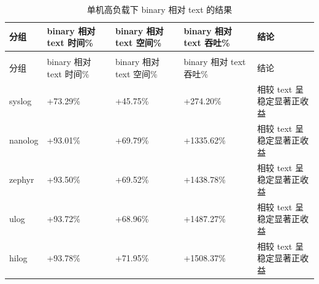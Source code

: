 \begin{longtable}[]{@{}
  >{\centering\arraybackslash}p{}
  >{\centering\arraybackslash}p{}
  >{\centering\arraybackslash}p{}
  >{\centering\arraybackslash}p{}
  >{\raggedright\arraybackslash}p{}@{}}
\caption{单机高负载下 binary 相对 text 的结果}\label{tbl:single-vs-text}\tabularnewline
\toprule\noalign{}
\begin{minipage}[t]{\hsize}\centering
分组
\end{minipage} & \begin{minipage}[t]{\hsize}\centering
binary 相对 text 时间\%
\end{minipage} & \begin{minipage}[t]{\hsize}\centering
binary 相对 text 空间\%
\end{minipage} & \begin{minipage}[t]{\hsize}\centering
binary 相对 text 吞吐\%
\end{minipage} & \begin{minipage}[t]{\hsize}\centering
结论
\end{minipage} \\
\midrule\noalign{}
\endfirsthead
\multicolumn{5}{r}{（续表\thetable）} \\
\toprule\noalign{}
\begin{minipage}[t]{\hsize}\centering
分组
\end{minipage} & \begin{minipage}[t]{\hsize}\centering
binary 相对 text 时间\%
\end{minipage} & \begin{minipage}[t]{\hsize}\centering
binary 相对 text 空间\%
\end{minipage} & \begin{minipage}[t]{\hsize}\centering
binary 相对 text 吞吐\%
\end{minipage} & \begin{minipage}[t]{\hsize}\centering
结论
\end{minipage} \\
\midrule\noalign{}
\endhead
\bottomrule\noalign{}
\endlastfoot
syslog & +73.29\% & +45.75\% & +274.20\% & 相较 text 呈稳定显著正收益 \\
nanolog & +93.01\% & +69.79\% & +1335.62\% & 相较 text 呈稳定显著正收益 \\
zephyr & +93.50\% & +69.52\% & +1438.78\% & 相较 text 呈稳定显著正收益 \\
ulog & +93.72\% & +68.96\% & +1487.27\% & 相较 text 呈稳定显著正收益 \\
hilog & +93.78\% & +71.95\% & +1508.37\% & 相较 text 呈稳定显著正收益 \\
\end{longtable}


